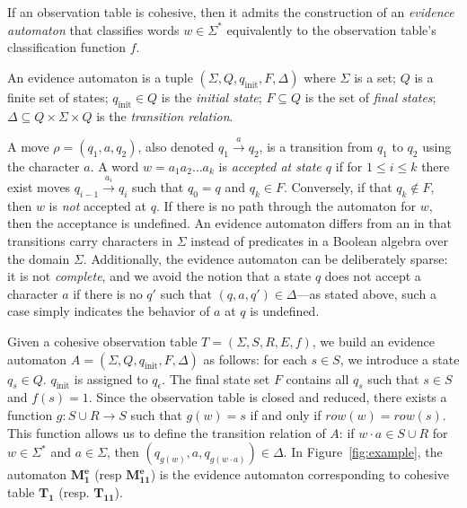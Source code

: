 If an observation table is cohesive,
then it admits the construction of an \emph{evidence automaton}
that classifies words $w \in \Sigma^*$
equivalently to the observation table's classification function $f$.

\begin{definition}
    An evidence automaton is a tuple
    $(\Sigma, Q, q_\text{init}, F, \Delta)$ where
    $\Sigma$ is a set;
    $Q$ is a finite set of states;
    $q_\text{init} \in Q$ is the \emph{initial state};
    $F \subseteq Q$ is the set of \emph{final states};
    $\Delta \subseteq Q \times \Sigma \times Q$ is the \emph{transition relation}.
\end{definition}
A move $\rho = (q_1, a, q_2)$,
also denoted $q_1 \xrightarrow{a} q_2$,
is a transition from $q_1$ to $q_2$ using the character $a$.  
A word $w = a_1 a_2 \ldots a_k$ is \emph{accepted at state $q$}
if for $1 \leq i \leq k$ there exist moves
$q_{i-1} \xrightarrow{a_i} q_i$ such that $q_0 = q$ and $q_k \in F$.
Conversely, if that $q_k \not \in F$, 
then $w$ is \emph{not} accepted at $q$.
If there is no path through the automaton for $w$,
then the acceptance is undefined.
An evidence automaton differs from an \SFA
in that transitions carry characters in $\Sigma$ instead of predicates
in a Boolean algebra over the domain $\Sigma$.
Additionally, the evidence automaton can be deliberately sparse:
it is not \emph{complete}, and we avoid 
the notion that a state $q$ does not accept a character $a$
if there is no $q'$ such that $(q, a, q') \in \Delta$---as
stated above, such
a case simply indicates the behavior of $a$ at $q$ is undefined.

Given a cohesive observation table
$T = (\Sigma, S, R, E, f)$, we build an evidence automaton
$A = (\Sigma, Q, q_\text{init}, F, \Delta)$
as follows:
for each $s \in S$, we introduce a state $q_s \in Q$. %
$q_\text{init}$ is assigned to $q_\epsilon$.
The final state set $F$ contains   all $q_s$ such that $s \in S$ and $f(s) = 1$.
%
Since the observation table is closed and reduced,
there exists a function $g : S \cup R \rightarrow S$
such that $g(w) = s$ if and only if $row(w) = row(s)$.
This function allows us to define the transition relation of $A$:
if $w \cdot a \in S \cup R$ for $w \in \Sigma^*$ and $a \in \Sigma$, then 
$(q_{g(w)}, a, q_{g(w \cdot a)}) \in \Delta$.
%
In Figure~\ref{fig:example}, the automaton $\mathbf{M_{1}^e}$ (resp $\mathbf{M_{11}^e}$) is the evidence automaton 
corresponding to cohesive table $\mathbf{T_{1}}$ (resp. $\mathbf{T_{11}}$).


